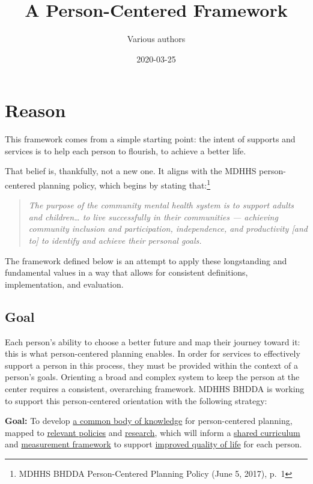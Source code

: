 \documentclass[
]{book}
\title{A Person-Centered Framework}
\author{Various authors}
\date{2020-03-25}
\begin{document}
\maketitle

{
\setcounter{tocdepth}{1}
\tableofcontents
}
\hypertarget{reason}{%
\chapter{Reason}\label{reason}}

This framework comes from a simple starting point: the intent of supports and services is to help each person to flourish, to achieve a better life.

That belief is, thankfully, not a new one. It aligns with the MDHHS person-centered planning policy, which begins by stating that:\footnote{MDHHS BHDDA Person-Centered Planning Policy (June 5, 2017), p.~1}

\begin{quote}
\emph{The purpose of the community mental health system is to support adults and children\ldots{} to live successfully in their communities --- achieving community inclusion and participation, independence, and productivity {[}and to{]} to identify and achieve their personal goals.}
\end{quote}

The framework defined below is an attempt to apply these longstanding and fundamental values in a way that allows for consistent definitions, implementation, and evaluation.

\hypertarget{goal}{%
\section{Goal}\label{goal}}

Each person's ability to choose a better future and map their journey toward it: this is what person-centered planning enables. In order for services to effectively support a person in this process, they must be provided within the context of a person's goals. Orienting a broad and complex system to keep the person at the center requires a consistent, overarching framework. MDHHS BHDDA is working to support this person-centered orientation with the following strategy:

\textbf{Goal:} To develop \protect\hyperlink{bok}{a common body of knowledge} for person-centered planning,
mapped to \protect\hyperlink{policy}{relevant policies} and \protect\hyperlink{research}{research},
which will inform a \protect\hyperlink{curriculum}{shared curriculum}
and \protect\hyperlink{measure}{measurement framework}
to support \protect\hyperlink{pcpdca}{improved quality of life} for each person.
\end{document}
